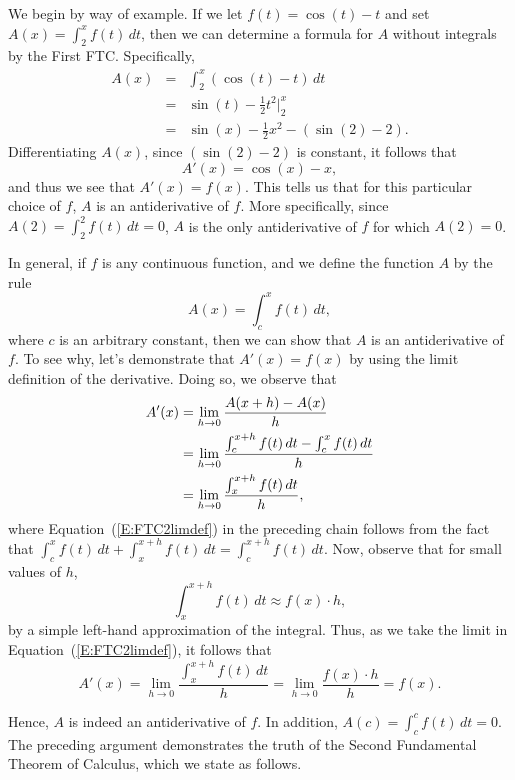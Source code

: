 We begin by way of example. If we let $f(t) = \cos(t) - t$ and set $A(x) = \int_2^x f(t) \, dt$, then we can determine a formula for $A$ without integrals by the First FTC.  Specifically,
\begin{eqnarray*}
A(x) & = & \int_2^x (\cos(t) - t) \, dt \\
	& = & \sin(t) - \frac{1}{2}t^2 \bigg\vert_2^x \\
	& = & \sin(x) -  \frac{1}{2}x^2 - \left(\sin(2) - 2 \right).
\end{eqnarray*}
Differentiating $A(x)$, since $(\sin(2) - 2)$ is constant, it follows that 
$$A'(x) = \cos(x) - x,$$
and thus we see that $A'(x) = f(x)$.  This tells us that for this particular choice of $f$, $A$ is an antiderivative of $f$.  More specifically, since $A(2) = \int_2^2 f(t) \, dt = 0$, $A$ is the only antiderivative of $f$ for which $A(2) = 0$.

In general, if $f$ is any continuous function, and we define the function $A$ by the rule 
$$A(x) = \int_c^x f(t) \, dt,$$
where $c$ is an arbitrary constant, then we can show that $A$ is an antiderivative of $f$.  To see why, let's demonstrate that $A'(x) = f(x)$ by using the limit definition of the derivative.  Doing so, we observe that
\begin{align}
A'(x) &= \lim_{h \to 0} \frac{A(x+h) - A(x)}{h} \notag \\
	&= \lim_{h \to 0} \frac{\int_c^{x+h} f(t) \, dt - \int_c^x f(t) \, dt}{h} \notag \\
	&= \lim_{h \to 0} \frac{\int_x^{x+h} f(t) \, dt}{h}, \label{E:FTC2limdef}
\end{align}
where Equation~(\ref{E:FTC2limdef}) in the preceding chain follows from the fact that $\int_c^x f(t) \,dt + \int_x^{x+h} f(t) \, dt = \int_c^{x+h} f(t) \, dt$.  Now, observe that for small values of $h$,
$$\int_x^{x+h} f(t) \, dt \approx f(x) \cdot h,$$
by a simple left-hand approximation of the integral.  Thus, as we take the limit in Equation~(\ref{E:FTC2limdef}), it follows that
$$A'(x) =  \lim_{h \to 0} \frac{\int_x^{x+h} f(t) \, dt}{h} = \lim_{h \to 0} \frac{f(x) \cdot h}{h} = f(x).$$


Hence, $A$ is indeed an antiderivative of $f$.  In addition, $A(c) = \int_c^c f(t) \, dt = 0.$  The preceding argument demonstrates the truth of the Second Fundamental Theorem of Calculus, which we state as follows.


